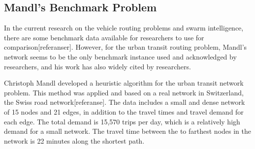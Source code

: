 \subsection{Mandl's Benchmark Problem}
In the current research on the vehicle routing problems and swarm intelligence, there are some benchmark data available for researchers to use for comparison[referanser]. However, for the urban transit routing problem, Mandl's network seems to be the only benchmark instance used and acknowledged by researchers, and his work has also widely cited by researchers.  
 
Christoph Mandl developed a heuristic algorithm for the urban transit network problem. This method was applied and based on a real network in Switzerland, the Swiss road network[referanse]. The data includes a small and dense network of 15 nodes and 21 edges, in addition to the travel times and travel demand for each edge. The total demand is 15,570 trips per day, which is a relatively high demand for a small network. The travel time between the to farthest nodes in the network is 22 minutes along the shortest path. 

